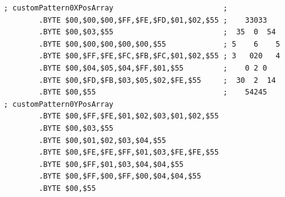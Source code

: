 \begin{lstlisting}
; customPattern0XPosArray                         ;
        .BYTE $00,$00,$00,$FF,$FE,$FD,$01,$02,$55 ;    33033   
        .BYTE $00,$03,$55                         ;  35  0  54 
        .BYTE $00,$00,$00,$00,$00,$55             ; 5    6    5
        .BYTE $00,$FF,$FE,$FC,$FB,$FC,$01,$02,$55 ; 3   020   4
        .BYTE $00,$04,$05,$04,$FF,$01,$55         ;    0 2 0   
        .BYTE $00,$FD,$FB,$03,$05,$02,$FE,$55     ;  30  2  14 
        .BYTE $00,$55                             ;    54245   
; customPattern0YPosArray
        .BYTE $00,$FF,$FE,$01,$02,$03,$01,$02,$55
        .BYTE $00,$03,$55
        .BYTE $00,$01,$02,$03,$04,$55
        .BYTE $00,$FE,$FE,$FF,$01,$03,$FE,$FE,$55
        .BYTE $00,$FF,$01,$03,$04,$04,$55
        .BYTE $00,$FF,$00,$FF,$00,$04,$04,$55
        .BYTE $00,$55

\end{lstlisting}



